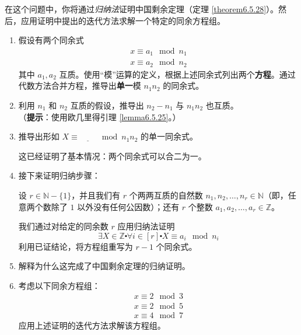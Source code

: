 \begin{exercise}\label{exc:exercises6.7.26}
    在这个问题中，你将通过\emph{归纳法}证明中国剩余定理（定理 \ref{theorem6.5.28}）。然后，应用证明中提出的迭代方法求解一个特定的同余方程组。
    \begin{enumerate}[label=(\alph*)]
        \item 假设有两个同余式
        \begin{align*}
            x \equiv a_1 \mod n_1\\
            x \equiv a_2 \mod n_2
        \end{align*}
        其中 $a_1, a_2$ 互质。使用``模''运算的定义，根据上述同余式列出两个\textbf{方程}。通过代数方法合并方程，推导出\textbf{单一}模 $n_1n_2$ 的同余式。
        \item 利用 $n_1$ 和 $n_2$ 互质的假设，推导出 $n_2 - n_1$ 与 $n_1n_2$ 也互质。\\
        （\textbf{提示}：使用欧几里得引理 \ref{lemma6.5.25}。）
        \item 推导出形如 $X \equiv \underline{\qquad} \mod n_1n_2$ 的单一同余式。
        
            这已经证明了基本情况：两个同余式可以合二为一。
        \item 接下来证明归纳步骤：

            设 $r \in \mathbb{N} - \{1\}$，并且我们有 $r$ 个两两互质的自然数 $n_1, n_2, \dots , n_r \in \mathbb{N}$（即，任意两个数除了 $1$ 以外没有任何公因数）；还有 $r$ 个整数 $a_1, a_2, \dots , a_r \in \mathbb{Z}$。

            我们通过对给定的同余数 $r$ 应用归纳法证明
            \[\exists X \in \mathbb{Z} \centerdot \forall i \in [r] \centerdot X \equiv a_i \mod n_i\]
            利用已证结论，将方程组重写为 $r-1$ 个同余式。
        \item 解释为什么这完成了中国剩余定理的归纳证明。
        \item 考虑以下同余方程组：
            \begin{align*}
                x \equiv 2 \mod 3 \\
                x \equiv 2 \mod 5 \\
                x \equiv 4 \mod 7
            \end{align*}
            应用上述证明的迭代方法求解该方程组。
    \end{enumerate}
\end{exercise}

